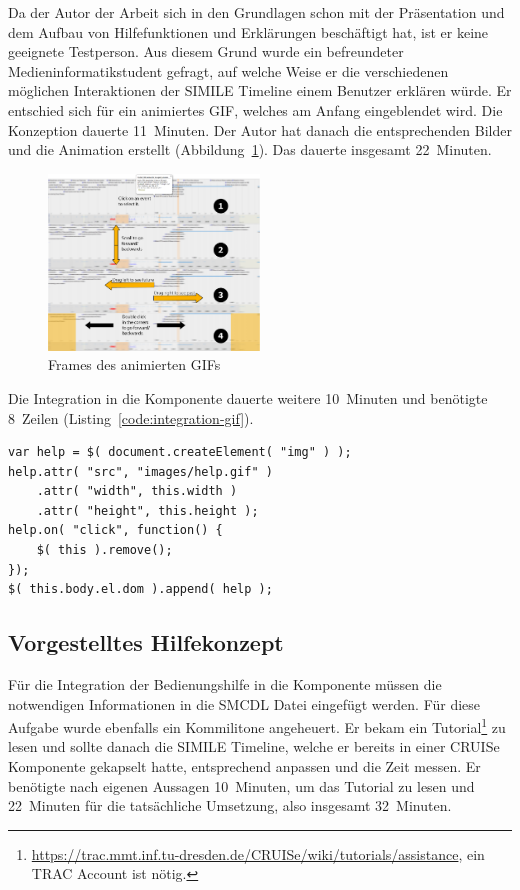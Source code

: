 \documentclass[
	headsepline,
	footsepline,
	fontsize=12pt,
	bibliography=totoc
]{scrbook}
\begin{document}
Da der Autor der Arbeit sich in den Grundlagen schon mit der Präsentation und dem Aufbau von Hilfefunktionen und Erklärungen beschäftigt hat, ist er keine geeignete Testperson. Aus diesem Grund wurde ein befreundeter Medieninformatikstudent gefragt, auf welche Weise er die verschiedenen möglichen Interaktionen der SIMILE Timeline einem Benutzer erklären würde. Er entschied sich für ein animiertes GIF, welches am Anfang eingeblendet wird. Die Konzeption dauerte 11~Minuten. Der Autor hat danach die entsprechenden Bilder und die Animation erstellt (Abbildung~\ref{figure:entwicklung-gif}). Das dauerte insgesamt 22~Minuten.

\begin{figure}[htbp]
   \centering
   \includegraphics[width=0.5\textwidth]{images/evaluation-entwicklung-gif.png}
   \caption{Frames des animierten GIFs}
   \label{figure:entwicklung-gif}
\end{figure}

Die Integration in die Komponente dauerte weitere 10~Minuten und benötigte 8~Zeilen (Listing~\ref{code:integration-gif}).

\lstset{language=Java}
\begin{lstlisting}[caption={Integration des GIFs}, label=code:integration-gif]
var help = $( document.createElement( "img" ) );
help.attr( "src", "images/help.gif" )
	.attr( "width", this.width )
	.attr( "height", this.height );
help.on( "click", function() {
	$( this ).remove();
});
$( this.body.el.dom ).append( help );
\end{lstlisting}

\subsection{Vorgestelltes Hilfekonzept}
\label{section:evaluation:entwicklungsaufwand:konzept}

Für die Integration der Bedienungshilfe in die Komponente müssen die notwendigen Informationen in die SMCDL Datei eingefügt werden. Für diese Aufgabe wurde ebenfalls ein Kommilitone angeheuert. Er bekam ein Tutorial\footnote{\url{https://trac.mmt.inf.tu-dresden.de/CRUISe/wiki/tutorials/assistance}, ein TRAC Account ist nötig.} zu lesen und sollte danach die SIMILE Timeline, welche er bereits in einer CRUISe Komponente gekapselt hatte, entsprechend anpassen und die Zeit messen. Er benötigte nach eigenen Aussagen 10~Minuten, um das Tutorial zu lesen und 22~Minuten für die tatsächliche Umsetzung, also insgesamt 32~Minuten.
\end{document}
